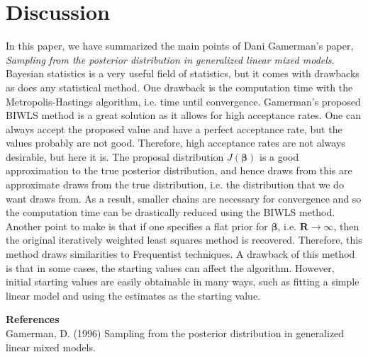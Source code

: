 \documentclass[12pt]{extarticle}
\begin{document}
\section{Discussion}
\noindent In this paper, we have summarized the main points of Dani Gamerman's paper, \textit{Sampling from the posterior distribution in generalized linear mixed models}.  Bayesian statistics is a very useful field of statistics, but it comes with drawbacks as does any statistical method.  One drawback is the computation time with the Metropolis-Hastings algorithm, i.e. time until convergence.  Gamerman's proposed BIWLS method is a great solution as it allows for high acceptance rates.  One can always accept the proposed value and have a perfect acceptance rate, but the values probably are not good.  Therefore, high acceptance rates are not always desirable, but here it is.  The proposal distribution $J(\bm\beta)$ is a good approximation to the true posterior distribution, and hence draws from this are approximate draws from the true distribution, i.e. the distribution that we do want draws from.  As a result, smaller chains are necessary for convergence and so the computation time can be drastically reduced using the BIWLS method. Another point to make is that if one specifies a flat prior for $\bm\beta$, i.e. $\mathbf{R} \to \infty$, then the original iteratively weighted least squares method is recovered.  Therefore, this method draws similarities to Frequentist techniques. A drawback of this method is that in some cases, the starting values can affect the algorithm.  However, initial starting values are easily obtainable in many ways, such as fitting a simple linear model and using the estimates as the starting value.
\newpage

\noindent\textbf{References}
\vspace{0.3cm}\\
Gamerman, D. (1996) Sampling from the posterior distribution in generalized linear mixed models.
\end{document}
